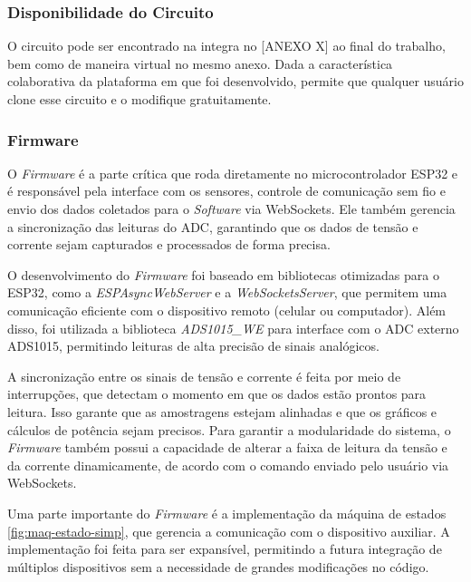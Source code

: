 \subsubsection{Disponibilidade do Circuito}\label{availability}

O circuito pode ser encontrado na integra no [ANEXO X] ao final do trabalho, bem como de maneira virtual no mesmo anexo. Dada a característica colaborativa da plataforma em que foi desenvolvido, permite que qualquer usuário clone esse circuito e o modifique gratuitamente.

\subsubsection{Firmware}\label{firmw}

O \textit{Firmware} é a parte crítica que roda diretamente no microcontrolador ESP32 e é responsável pela interface com os sensores, controle de comunicação sem fio e envio dos dados coletados para o \textit{Software} via WebSockets. Ele também gerencia a sincronização das leituras do ADC, garantindo que os dados de tensão e corrente sejam capturados e processados de forma precisa.

O desenvolvimento do \textit{Firmware} foi baseado em bibliotecas otimizadas para o ESP32, como a \textit{ESPAsyncWebServer} e a \textit{WebSocketsServer}, que permitem uma comunicação eficiente com o dispositivo remoto (celular ou computador). Além disso, foi utilizada a biblioteca \textit{ADS1015\_WE} para interface com o ADC externo ADS1015, permitindo leituras de alta precisão de sinais analógicos.

A sincronização entre os sinais de tensão e corrente é feita por meio de interrupções, que detectam o momento em que os dados estão prontos para leitura. Isso garante que as amostragens estejam alinhadas e que os gráficos e cálculos de potência sejam precisos. Para garantir a modularidade do sistema, o \textit{Firmware} também possui a capacidade de alterar a faixa de leitura da tensão e da corrente dinamicamente, de acordo com o comando enviado pelo usuário via WebSockets.

Uma parte importante do \textit{Firmware} é a implementação da máquina de estados \autoref{fig:maq-estado-simp}, que gerencia a comunicação com o dispositivo auxiliar. A implementação foi feita para ser expansível, permitindo a futura integração de múltiplos dispositivos sem a necessidade de grandes modificações no código.


